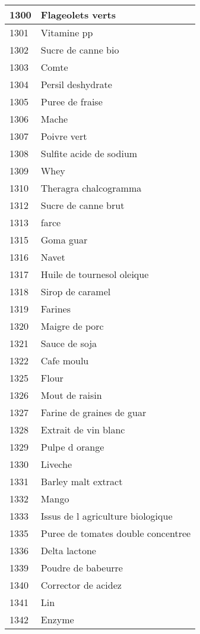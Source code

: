\begin{longtable}{|l|l|}
1300 & Flageolets verts \\ \hline 
1301 & Vitamine pp \\ \hline 
1302 & Sucre de canne bio \\ \hline 
1303 & Comte \\ \hline 
1304 & Persil deshydrate \\ \hline 
1305 & Puree de fraise \\ \hline 
1306 & Mache \\ \hline 
1307 & Poivre vert \\ \hline 
1308 & Sulfite acide de sodium \\ \hline 
1309 & Whey \\ \hline 
1310 & Theragra chalcogramma \\ \hline 
1312 & Sucre de canne brut \\ \hline 
1313 & farce \\ \hline 
1315 & Goma guar \\ \hline 
1316 & Navet \\ \hline 
1317 & Huile de tournesol oleique \\ \hline 
1318 & Sirop de caramel \\ \hline 
1319 & Farines \\ \hline 
1320 & Maigre de porc \\ \hline 
1321 & Sauce de soja \\ \hline 
1322 & Cafe moulu \\ \hline 
1325 & Flour \\ \hline 
1326 & Mout de raisin \\ \hline 
1327 & Farine de graines de guar \\ \hline 
1328 & Extrait de vin blanc \\ \hline 
1329 & Pulpe d orange \\ \hline 
1330 & Liveche \\ \hline 
1331 & Barley malt extract \\ \hline 
1332 & Mango \\ \hline 
1333 & Issus de l agriculture biologique \\ \hline 
1335 & Puree de tomates double concentree \\ \hline 
1336 & Delta lactone \\ \hline 
1339 & Poudre de babeurre \\ \hline 
1340 & Corrector de acidez \\ \hline 
1341 & Lin \\ \hline 
1342 & Enzyme \\ \hline 

\end{longtable}
